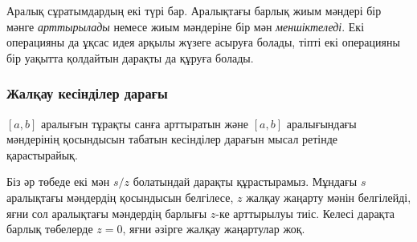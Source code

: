 
Аралық сұратымдардың екі түрі бар. 
Аралықтағы барлық жиым мәндері бір мәнге \emph{арттырылады} 
немесе жиым мәндеріне бір мән \emph{меншіктеледі}.
Екі операцияны да ұқсас идея арқылы жүзеге асыруға болады,
тіпті екі операцияны бір уақытта қолдайтын дарақты да
құруға болады. 



\subsubsection{Жалқау кесінділер дарағы}

$[a,b]$ аралығын тұрақты санға арттыратын және
$[a,b]$ аралығындағы мәндерінің қосындысын табатын кесінділер дарағын
мысал ретінде қарастырайық. 


Біз әр төбеде екі мән $s/z$ болатындай дарақты
құрастырамыз. Мұндағы $s$ аралықтағы мәндердің 
қосындысын белгілесе, $z$ жалқау жаңарту мәнін 
белгілейді, яғни сол аралықтағы мәндердің барлығы
$z$-ке арттырылуы тиіс. Келесі дарақта барлық
төбелерде $z=0$, яғни әзірге жалқау жаңартулар жоқ.

